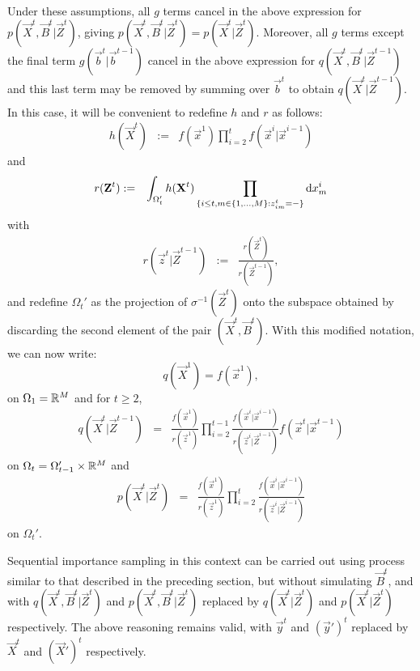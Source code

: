 Under these assumptions, all $g$ terms cancel in the above expression for $p(\vec{X}^t, \vec{B}^t | \vec{Z}^t)$, giving $p(\vec{X}^t, \vec{B}^t | \vec{Z}^t) = p(\vec{X}^t | \vec{Z}^t)$. Moreover, all $g$ terms except the final term $g(\vec{b}^t | \vec{b}^{t-1})$ cancel in the above expression for $q(\vec{X}^t, \vec{B}^t | \vec{Z}^{t-1})$ and this last term may be removed by summing over $\vec{b}^t$ to obtain $q(\vec{X}^t | \vec{Z}^{t-1})$. In this case, it will be convenient to redefine $h$ and $r$ as follows:
\begin{eqnarray*}
h(\vec{X}^t) & := & f(\vec{x}^1)\prod_{i=2}^{t} f(\vec{x}^i | \vec{x}^{i-1})
\end{eqnarray*}
and
\begin{eqnarray*}
r(\mathbf{Z}^t) & := & \int_{\Omega_t'}  h(\mathbf{X}^t) \prod_{ \{ i \leq t, m \in \{1, \ldots, M \} : z^t_{im} = - \} } \mathrm{d} x^i_m
\end{eqnarray*}
with
\begin{eqnarray*}
r(\vec{z}^t | \vec{Z}^{t-1}) & := & \frac{r(\vec{Z}^t)}{r(\vec{Z}^{t-1})},
\end{eqnarray*}
and redefine $\Omega_t'$ as the projection of $\sigma^{-1}(\vec{Z}^t)$ onto the subspace obtained by discarding the second element of the pair $(\vec{X}^t,\vec{B}^t)$. With this modified notation, we can now write:
\[
q(\vec{X}^1) = f(\vec{x}^1),
\]
on $\Omega_1 = \mathbb R^M$ and for $t \geq 2$,
\begin{eqnarray*}
    q(\vec{X}^t | \vec{Z}^{t-1}) & = & \frac{f(\vec{x}^1)}{r(\vec{z}^1)}  \prod_{i=2}^{t-1} \frac{f(\vec{x}^i | \vec{x}^{i-1}) }{r(\vec{z}^i | \vec{Z}^{i-1})} f(\vec{x}^t | \vec{x}^{t-1})
\end{eqnarray*}
on $\Omega_t = \Omega_{t-1}' \times \mathbb R^M $ and 
\begin{eqnarray*}
    p(\vec{X}^t | \vec{Z}^t) 
& = & \frac{f(\vec{x}^1)}{r(\vec{z}^1)} \prod_{i=2}^t \frac{f(\vec{x}^i | \vec{x}^{i-1}) }{r(\vec{z}^i | \vec{Z}^{i-1})} 
\end{eqnarray*}
on $\Omega_t'$.

Sequential importance sampling in this context can be carried out using process similar to that described in the preceding section, but without simulating $\vec{B}^t$, and with $q(\vec{X}^t, \vec{B}^t | \vec{Z}^t)$ and $p(\vec{X}^t, \vec{B}^t | \vec{Z}^t)$ replaced by  $q(\vec{X}^t | \vec{Z}^t)$ and $p(\vec{X}^t | \vec{Z}^t)$ respectively. The above reasoning remains valid, with $\vec{y}^t$ and $(\vec{y}')^t$ replaced by $\vec{X}^t$ and $(\vec{X}')^t$ respectively. 

